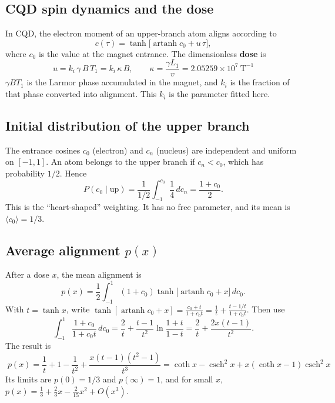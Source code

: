 \documentclass[11pt,a4paper]{article}
\newcommand{\artanh}{\operatorname{artanh}}
\newcommand{\csch}{\operatorname{csch}}
\newcommand{\kan}{k_i}
\begin{document}
\subsection{CQD spin dynamics and the dose}
In CQD, the electron moment of an upper-branch atom aligns according to
\begin{equation}
c(\tau) = \tanh\!\big[\artanh c_0 + u\,\tau\big],
\label{eq:tanh}
\end{equation}
where $c_0$ is the value at the magnet entrance. The dimensionless \textbf{dose} is
\begin{equation}
\boxed{\;u = \kan\,\gamma\,B\,T_1 = \kan\,\kappa\,B,\qquad \kappa = \frac{\gamma L_1}{v} = 2.05259\times10^7\ \text{T}^{-1}\;}
\label{eq:dose}
\end{equation}
$\gamma BT_1$ is the Larmor phase accumulated in the magnet, and $\kan$ is the fraction of that phase converted into alignment. This $\kan$ is the parameter fitted here.

\subsection{Initial distribution of the upper branch}
The entrance cosines $c_0$ (electron) and $c_n$ (nucleus) are independent and uniform on $[-1,1]$. An atom belongs to the upper branch if $c_n<c_0$, which has probability $1/2$. Hence
\begin{equation}
P(c_0\mid\text{up}) = \frac{1}{1/2}\int_{-1}^{c_0}\frac14\,dc_n = \frac{1+c_0}{2}.
\label{eq:heart}
\end{equation}
This is the ``heart-shaped'' weighting. It has no free parameter, and its mean is $\langle c_0\rangle = 1/3$.

\subsection{Average alignment $p(x)$}
After a dose $x$, the mean alignment is
\begin{equation}
p(x) = \frac12\int_{-1}^1 (1+c_0)\tanh\!\big[\artanh c_0 + x\big]\,dc_0 .
\label{eq:pint}
\end{equation}
With $t=\tanh x$, write $\tanh[\artanh c_0+x] = \frac{c_0+t}{1+c_0t} = \frac1t + \frac{t-1/t}{1+c_0t}$. Then use
\[
\int_{-1}^1\frac{1+c_0}{1+c_0t}\,dc_0 = \frac2t + \frac{t-1}{t^2}\ln\frac{1+t}{1-t} = \frac2t + \frac{2x(t-1)}{t^2}.
\]
The result is
\begin{equation}
\boxed{\;p(x) = \frac1t + 1 - \frac1{t^2} + \frac{x(t-1)(t^2-1)}{t^3}
= \coth x - \csch^2x + x(\coth x-1)\csch^2 x\;}
\label{eq:pclosed}
\end{equation}
Its limits are $p(0)=1/3$ and $p(\infty)=1$, and for small $x$, $p(x) = \frac13 + \frac23x - \frac2{15}x^2 + O(x^3)$.
\end{document}
